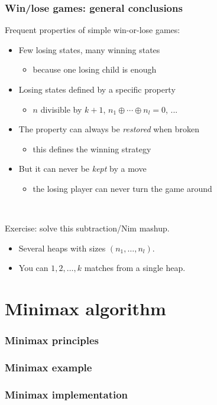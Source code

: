 \documentclass[12pt]{beamer}
\begin{document}
\begin{frame}
\frametitle{Win/lose games: general conclusions}
Frequent properties of simple win-or-lose games:
\begin{itemize}
\item Few losing states, many winning states
\begin{itemize} \item because one losing child is enough \end{itemize}
\item Losing states defined by a specific property
\begin{itemize} \item $n$ divisible by $k+1$, $n_1 \oplus \cdots \oplus n_l = 0$, ... \end{itemize}
\item The property can always be \emph{restored} when broken
\begin{itemize} \item this defines the winning strategy \end{itemize}
\item But it can never be \emph{kept} by a move
\begin{itemize} \item the losing player can never turn the game around \end{itemize}
\end{itemize}

~

Exercise: solve this subtraction/Nim mashup.
\begin{itemize}
\item Several heaps with sizes $(n_1,\ldots,n_l)$.
\item You can $1,2,\ldots,k$ matches from a single heap.
\end{itemize}
\end{frame}


\section{Minimax algorithm}
\begin{frame}
\frametitle{Minimax principles}
\end{frame}

\begin{frame}
\frametitle{Minimax example}
\end{frame}

\begin{frame}
\frametitle{Minimax implementation}
\end{frame}
\end{document}
